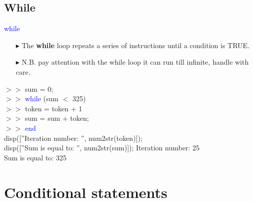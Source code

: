 \documentclass[xcolor={dvipsnames,rgb}, aspectratio=169]{beamer}
\begin{document}
\subsection{While}
\begin{frame}{\textcolor{blue}{while}}
\vspace{-10pt}
\begin{itemize}
    \item[$\blacktriangleright$] The \textbf{while} loop repeats a series of instructions
       \alert{until a condition is TRUE}.
    \item[$\blacktriangleright$] N.B. pay attention with the while loop it can run till
       infinite, \alert{handle with care}.
\end{itemize}
\begin{tcolorbox}[colback=white,colframe=bluepoli]
   $>>$ sum = 0; \\
   $>>$ \textcolor{blue}{while} (sum $<$ 325)\\
   $>>$ \hspace{1em}token = token + 1\\
   $>>$ \hspace{1em}sum = sum + token; \\
   $>>$ \textcolor{blue}{end}\\
   disp([''Iteration number: '', num2str(token)]); \\
   disp([''Sum is equal to:  '', num2str(sum)]); 
   \tcblower
   Iteration number: 25 \\
   Sum is equal to: 325
\end{tcolorbox}
\end{frame}

\section{Conditional statements}
\end{document}
